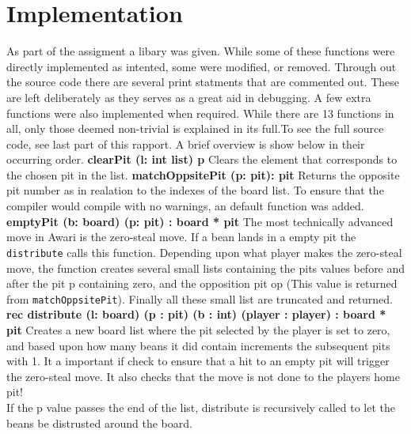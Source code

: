 \documentclass{article}
\begin{document}
    \section{Implementation}
        As part of the assigment a libary was given. While some of these functions were directly implemented as intented, some were modified, or removed. Through out the source code there are several print statments that are commented out. These are left deliberately as they serves as a great aid in debugging. A few extra functions were also implemented when required. While there are 13 functions in all, only those deemed non-trivial is explained in its full.\newline To see the full source code, see last part of this rapport. A brief overview is show below in their occurring order. \newline         
        \textbf{clearPit (l: int list) p}
         Clears the element that corresponds to the chosen pit in the list.\newline
         \textbf{matchOppsitePit (p: pit): pit }\newline
                Returns the opposite pit number as in realation to the indexes of the board list. To ensure that the compiler would compile with no warnings, an default function was added.  \newline 
        \textbf{emptyPit (b: board) (p: pit) : board * pit }\newline
                The most technically advanced move in Awari is the zero-steal move. If a bean lands in a empty pit the \verb|distribute| calls this function. Depending upon what player makes the zero-steal move, the function creates several small lists containing the pits values before and after the pit p containing zero, and the opposition pit op (This value is returned from \verb|matchOppsitePit|). Finally all these small list are truncated and returned.  \newline
         \textbf{ rec distribute (l: board) (p : pit) (b : int) (player : player) : board * pit }\newline
        Creates a new board list where the pit selected by the player is set to zero, and based upon how many beans it did contain increments the subsequent pits with 1. It a important if check to ensure that a hit to an empty pit will trigger the zero-steal move. It also checks that the move is not done to the players home pit!\\
        If the p value passes the end of the list, distribute is recursively called to let the beans be distrusted around the board.\newline
\end{document}
